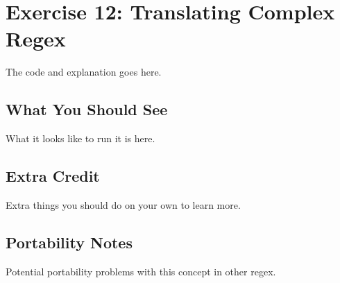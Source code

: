 \chapter{Exercise 12: Translating Complex Regex}


The code and explanation goes here.

\section{What You Should See}

What it looks like to run it is here.

\section{Extra Credit}

Extra things you should do on your own to learn more.

\section{Portability Notes}

Potential portability problems with this concept in other regex.

